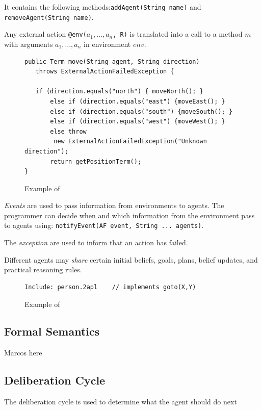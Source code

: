 \documentclass[a4paper]{article}
\begin{document}
It contains the following methods:\texttt{addAgent(String name)} and \texttt{removeAgent(String name)}.

Any external action \texttt{@env($a_1, \ldots, a_n$, R)} is translated into a call to a method $m$ with arguments $a_1, \ldots, a_n$ in environment $env$.

\begin{figure}[htp]
\begin{verbatim}
public Term move(String agent, String direction)
   throws ExternalActionFailedException {
  	   
   if (direction.equals("north") { moveNorth(); }
   	   else if (direction.equals("east") {moveEast(); }
   	   else if (direction.equals("south") {moveSouth(); }
   	   else if (direction.equals("west") {moveWest(); }
   	   else throw
        new ExternalActionFailedException("Unknown direction");
   	   return getPositionTerm();
}
\end{verbatim}
\caption{Example of}
\label{fig:example_env}
\end{figure}

\emph{Events} are used to pass information from environments to agents. The programmer can decide when and which information from the environment pass to agents using: \texttt{notifyEvent(AF event, String ... agents)}.

The \emph{exception} are used to inform that an action has failed. 

Different agents may \emph{share} certain initial beliefs, goals, plans, belief updates, and practical reasoning rules.

\begin{figure}[htp]
\begin{verbatim}
Include: person.2apl    // implements goto(X,Y)
\end{verbatim}
\caption{Example of}
\label{fig:example_include}
\end{figure}

\subsection{Formal Semantics} %

Marcos here

\subsection{Deliberation Cycle} %

The deliberation cycle is used to determine what the agent should do next
\end{document}
